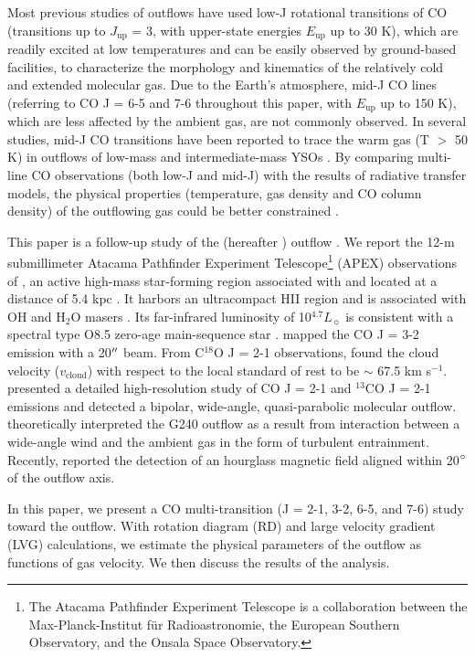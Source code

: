 Most previous studies of outflows have used low-J rotational transitions of CO (transitions up to $J_{\mathrm{up}}$ = 3, with upper-state energies $E_{\mathrm{up}}$ up to 30 K), which are readily excited at low temperatures and can be easily observed by ground-based facilities, to characterize the morphology and kinematics of the relatively cold and extended molecular gas. Due to the Earth's atmosphere, mid-J CO lines (referring to CO J = 6-5 and 7-6 throughout this paper, with  $E_{\mathrm{up}}$ up to 150 K), which are less affected by the ambient gas, are not commonly observed. In several studies, mid-J CO transitions have been reported to trace the warm gas (T $>$ 50 K) in outflows of low-mass and intermediate-mass YSOs \citep{2009A&A...501..633V, 2009A&A...507.1425V, 2012A&A...542A..86Y, 2016A&A...587A..17V}. By comparing multi-line CO observations (both low-J and mid-J) with the results of radiative transfer models, the physical properties (temperature, gas density and CO column density) of the outflowing gas could be better constrained \citep{2015A&A...581A...4L}. 

This paper is a follow-up study of the  (hereafter ) outflow \citep{2009ApJ...696...66Q}. We report the 12-m submillimeter Atacama Pathfinder Experiment Telescope\footnote{    The Atacama Pathfinder Experiment Telescope is a collaboration between the Max-Planck-Institut f{\"u}r Radioastronomie, the European Southern Observatory, and the Onsala Space Observatory.} (APEX) observations of , an active high-mass star-forming region associated with  and located at a distance of 5.4 kpc \citep{2014ApJ...790...99C, 2015PASJ...67...69S}. It harbors an ultracompact H{\scriptsize II} region and is associated with OH and H$_2$O masers \citep{1993AJ....105.1495H, 1997MNRAS.289..203C, 1998AJ....116.1897M, 1999ApJS..123..487M, 2003MNRAS.341..551C}. Its far-infrared luminosity of 10$^{4.7}  L_\sun$ is consistent with a spectral type O8.5 zero-age main-sequence star \citep{1998AJ....116.1897M}. \citet{2003A&A...412..175K} mapped the CO J = 3-2 emission with a 20${\mbox{$^{\prime\prime}$}}$ beam. From C$^{18}$O J = 2-1 observations, \citet{2003A&A...412..175K} found the cloud velocity ($v_{\mathrm{cloud}}$) with respect to the local standard of rest to be $\sim$ 67.5 km s$^{-1}$. \citet{2009ApJ...696...66Q} presented a detailed high-resolution study of CO J = 2-1 and $^{13}$CO J = 2-1 emissions and detected a bipolar, wide-angle, quasi-parabolic molecular outflow. \citet{2013A&A...559A..23L} theoretically interpreted the G240 outflow as a result from interaction between a wide-angle wind and the ambient gas in the form of turbulent entrainment. Recently, \citet{2014ApJ...794L..18Q} reported the detection of an hourglass magnetic field aligned within 20${\mbox{$^\circ$}}$ of the outflow axis.

In this paper, we present a CO multi-transition (J = 2-1, 3-2, 6-5, and 7-6) study toward the  outflow. With rotation diagram (RD) and large velocity gradient (LVG) calculations, we estimate the physical parameters of the outflow as functions of gas velocity. We then discuss the results of the analysis.


